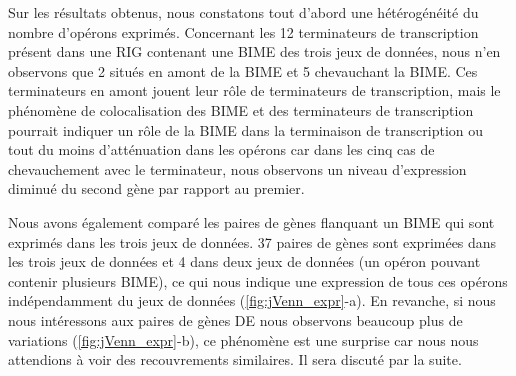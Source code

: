 \documentclass[12pt,a4paper]{report}
\begin{document}
\begin{onehalfspace}
Sur les résultats obtenus, nous constatons tout d'abord une hétérogénéité du nombre d'opérons exprimés. Concernant les 12 terminateurs de transcription présent dans une RIG contenant une BIME des trois jeux de données, nous n'en observons que 2 situés en amont de la BIME et 5 chevauchant la BIME. Ces terminateurs en amont jouent leur rôle de terminateurs de transcription, mais le phénomène de colocalisation des BIME et des terminateurs de transcription pourrait indiquer un rôle de la BIME dans la terminaison de transcription ou tout du moins d'atténuation dans les opérons car dans les cinq cas de chevauchement avec le terminateur, nous observons un niveau d'expression diminué du second gène par rapport au premier.

\begin{figure}
\end{figure}

Nous avons également comparé les paires de gènes flanquant un BIME qui sont exprimés dans les trois jeux de données. 37 paires de gènes sont exprimées dans les trois jeux de données et 4 dans deux jeux de données (un opéron pouvant contenir plusieurs BIME), ce qui nous indique une expression de tous ces opérons indépendamment du jeux de données (\autoref{fig:jVenn_expr}-a). En revanche, si nous nous intéressons aux paires de gènes DE nous observons beaucoup plus de variations (\autoref{fig:jVenn_expr}-b), ce phénomène est une surprise car nous nous attendions à voir des recouvrements similaires. Il sera discuté par la suite.


\end{onehalfspace}
\end{document}
